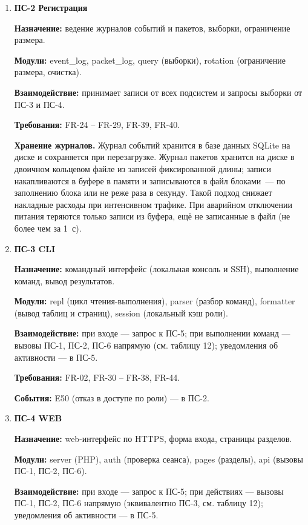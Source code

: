 \documentclass[13pt,a4paper,final]{article}
\begin{document}
\begin{enumerate}
		\item \textbf{ПС-2 Регистрация}
		
		\textbf{Назначение:} ведение журналов событий и пакетов, выборки, ограничение размера.
		
		\textbf{Модули:} event\_log, packet\_log, query (выборки), rotation (ограничение размера, очистка).
		
		\textbf{Взаимодействие:} принимает записи от всех подсистем и запросы выборки от {ПС-3 и ПС-4}.
		
		\textbf{Требования:} FR-24 – FR-29, FR-39, FR-40.
		
		\textbf{Хранение журналов.} Журнал событий хранится в базе данных SQLite на диске и сохраняется при перезагрузке. Журнал пакетов хранится на диске в двоичном кольцевом файле из записей фиксированной длины; записи накапливаются в буфере в памяти и записываются в файл блоками~--- по заполнению блока или не реже раза в секунду. Такой подход снижает накладные расходы при интенсивном трафике. При аварийном отключении питания теряются только записи из буфера, ещё не записанные в файл (не более чем за 1~с).
		
		\item 	\textbf{ПС-3 CLI}
		
		\textbf{Назначение:} командный интерфейс (локальная консоль и SSH), выполнение команд, вывод результатов.
		
		\textbf{Модули:} repl (цикл чтения-выполнения), parser (разбор команд), formatter (вывод таблиц и страниц), session (локальный кэш роли).
		
		\textbf{Взаимодействие:} при входе — запрос к ПС-5; при выполнении команд — {вызовы ПС-1, ПС-2, ПС-6 напрямую (см. таблицу 12)}; уведомления об активности — в ПС-5.
		
		\textbf{Требования:} FR-02, FR-30 – FR-38, FR-44.
		
		\textbf{События:} E50 (отказ в доступе по роли) — в ПС-2.
		
		\item	\textbf{ПС-4 WEB}
		
		\textbf{Назначение:} web-интерфейс по HTTPS, форма входа, страницы разделов.
		
		\textbf{Модули:} server (PHP), auth (проверка сеанса), pages (разделы), api (вызовы {ПС-1, ПС-2, ПС-6}).
		
		\textbf{Взаимодействие:} при входе — запрос к ПС-5; при действиях — {вызовы ПС-1, ПС-2, ПС-6 напрямую (эквивалентно ПС-3, см. таблицу 12)}; уведомления об активности — в ПС-5.
		

\end{enumerate}
\end{document}
